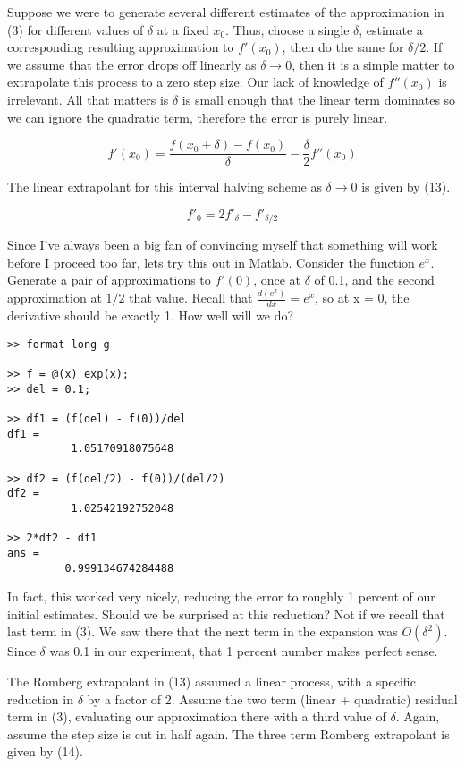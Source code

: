 \documentclass[a4paper,11pt]{article}
\begin{document}
Suppose we were to generate several different estimates of the approximation in (3) for
different values of $\delta$ at a fixed $x_0$. Thus, choose a single $\delta$, estimate a
corresponding resulting approximation to $f'(x_0)$, then do the same for $\delta/2$.
If we assume that the error drops off linearly as $\delta \to 0$, then it is a simple matter
to extrapolate this process to a zero step size. Our lack of knowledge of $f''(x_0)$ is
irrelevant. All that matters is $\delta$ is small enough that the linear term dominates so we
can ignore the quadratic term, therefore the error is purely linear.

\begin{equation} \tag{12}
   f'(x_0) = \frac{f(x_0+\delta) - f(x_0)}{\delta} - \frac{\delta}{2} f''(x_0)
\end{equation}

The linear extrapolant for this interval halving scheme as $\delta \to 0$ is given by (13).

\begin{equation} \tag{13}
   f'_0 = 2f'_\delta - f'_{\delta/2}
\end{equation}

Since I've always been a big fan of convincing myself that something will work before I
proceed too far, lets try this out in Matlab. Consider the function $e^x$. Generate a pair of 
approximations to $f'(0)$, once at $\delta$ of 0.1, and the second approximation at $1/2$
that value. Recall that $\frac{d(e^x)}{dx} = e^x$, so at x = 0, the derivative should be
exactly 1. How well will we do?

\begin{lstlisting}
>> format long g

>> f = @(x) exp(x);
>> del = 0.1;

>> df1 = (f(del) - f(0))/del
df1 =
          1.05170918075648

>> df2 = (f(del/2) - f(0))/(del/2)
df2 =
          1.02542192752048

>> 2*df2 - df1
ans =
         0.999134674284488
\end{lstlisting}

In fact, this worked very nicely, reducing the error to roughly 1 percent of our initial estimates.
Should we be surprised at this reduction? Not if we recall that last term in (3). We saw there that
the next term in the expansion was $O(\delta^2)$. Since $\delta$ was 0.1 in our experiment, that
1 percent number makes perfect sense.

The Romberg extrapolant in (13) assumed a linear process, with a specific reduction in $\delta$
by a factor of 2. Assume the two term (linear + quadratic) residual term in (3), evaluating our approximation there with a third value of $\delta$. Again, assume the step size is cut in half again.
The three term Romberg extrapolant is given by (14).
\end{document}
